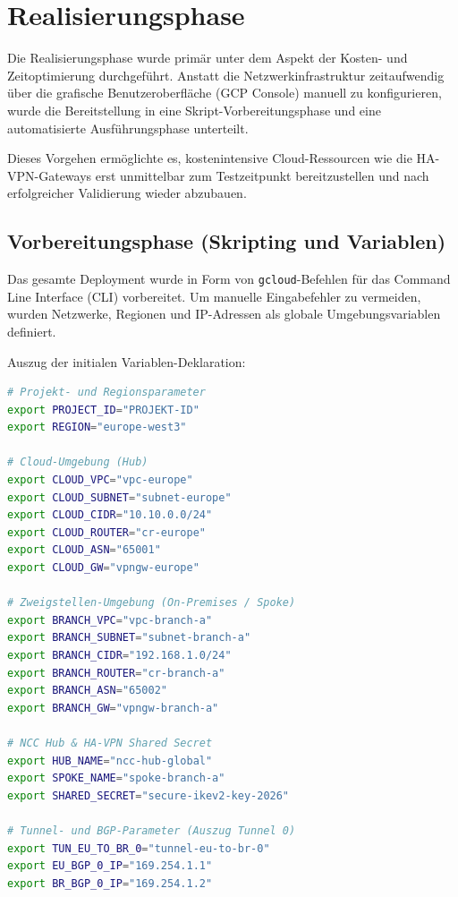 \chapter{Realisierungsphase}

Die Realisierungsphase wurde primär unter dem Aspekt der Kosten- und Zeitoptimierung durchgeführt. Anstatt die Netzwerkinfrastruktur zeitaufwendig über die grafische Benutzeroberfläche (GCP Console) manuell zu konfigurieren, wurde die Bereitstellung in eine Skript-Vorbereitungsphase und eine automatisierte Ausführungsphase unterteilt.

Dieses Vorgehen ermöglichte es, kostenintensive Cloud-Ressourcen wie die HA-VPN-Gateways erst unmittelbar zum Testzeitpunkt bereitzustellen und nach erfolgreicher Validierung wieder abzubauen.

\section{Vorbereitungsphase (Skripting und Variablen)}
Das gesamte Deployment wurde in Form von \texttt{gcloud}-Befehlen für das Command Line Interface (CLI) vorbereitet. Um manuelle Eingabefehler zu vermeiden, wurden Netzwerke, Regionen und IP-Adressen als globale Umgebungsvariablen definiert. 

Auszug der initialen Variablen-Deklaration:

\begin{lstlisting}[language=bash, caption={Definition der Umgebungsvariablen}]
# Projekt- und Regionsparameter
export PROJECT_ID="PROJEKT-ID"
export REGION="europe-west3"

# Cloud-Umgebung (Hub)
export CLOUD_VPC="vpc-europe"
export CLOUD_SUBNET="subnet-europe"
export CLOUD_CIDR="10.10.0.0/24"
export CLOUD_ROUTER="cr-europe"
export CLOUD_ASN="65001"
export CLOUD_GW="vpngw-europe"

# Zweigstellen-Umgebung (On-Premises / Spoke)
export BRANCH_VPC="vpc-branch-a"
export BRANCH_SUBNET="subnet-branch-a"
export BRANCH_CIDR="192.168.1.0/24"
export BRANCH_ROUTER="cr-branch-a"
export BRANCH_ASN="65002"
export BRANCH_GW="vpngw-branch-a"

# NCC Hub & HA-VPN Shared Secret
export HUB_NAME="ncc-hub-global"
export SPOKE_NAME="spoke-branch-a"
export SHARED_SECRET="secure-ikev2-key-2026"

# Tunnel- und BGP-Parameter (Auszug Tunnel 0)
export TUN_EU_TO_BR_0="tunnel-eu-to-br-0"
export EU_BGP_0_IP="169.254.1.1"
export BR_BGP_0_IP="169.254.1.2"
\end{lstlisting}

